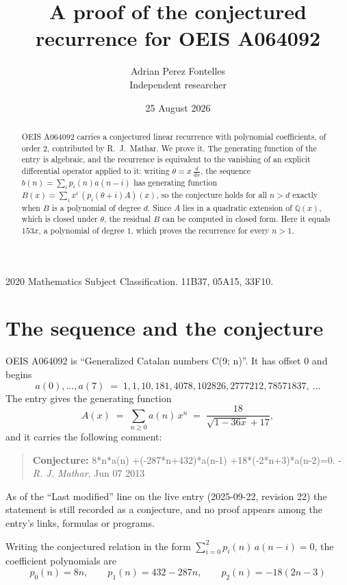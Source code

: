 \documentclass[11pt,a4paper]{article}
\title{A proof of the conjectured recurrence for OEIS A064092}
\author{Adrian Perez Fontelles\\ \small Independent researcher}
\date{25 August 2026}
\theoremstyle{plain}
\theoremstyle{definition}
\begin{document}
\maketitle

\begin{abstract}
OEIS A064092 carries a conjectured linear recurrence with polynomial coefficients, of
order 2, contributed by R.~J.~Mathar. We prove it. The generating function of the
entry is algebraic, and the recurrence is equivalent to the vanishing of an explicit
differential operator applied to it: writing $\theta=x\,\frac{d}{dx}$, the sequence
$b(n)=\sum_{i}p_{i}(n)a(n-i)$ has generating function
$B(x)=\sum_{i}x^{i}\,(p_{i}(\theta+i)A)(x)$, so the conjecture holds for all $n>d$ exactly
when $B$ is a polynomial of degree $d$. Since $A$ lies in a quadratic extension of
$\mathbb{Q}(x)$, which is closed under $\theta$, the residual $B$ can be computed in
closed form. Here it equals $153 x$, a polynomial of degree $1$, which proves
the recurrence for every $n>1$.
\end{abstract}

\noindent\small 2020 Mathematics Subject Classification. 11B37, 05A15, 33F10.\normalsize

\section{The sequence and the conjecture}

OEIS A064092 is ``Generalized Catalan numbers C(9; n)''. It has offset $0$ and begins
\[
a(0),\dots,a(7)\;=\;1, 1, 10, 181, 4078, 102826, 2777212, 78571837,\ \dots
\]
The entry gives the generating function
\begin{equation}\label{eq:gf}
A(x)\;=\;\sum_{n\ge 0} a(n)\,x^{n}\;=\;\frac{18}{\sqrt{1 - 36 x} + 17} ,
\end{equation}
and it carries the following comment:
\begin{quote}\small
\textbf{Conjecture:} 8*n*a(n) +(-287*n+432)*a(n-1) +18*(-2*n+3)*a(n-2)=0. - \emph{R. J. Mathar}, Jun 07 2013
\end{quote}
As of the ``Last modified'' line on the live entry (2025-09-22, revision 22) the
statement is still recorded as a conjecture, and no proof appears among the entry's links,
formulas or programs.

Writing the conjectured relation in the form $\sum_{i=0}^{2}p_{i}(n)\,a(n-i)=0$,
the coefficient polynomials are
\[
p_{0}(n)=8 n,\qquad p_{1}(n)=432 - 287 n,\qquad p_{2}(n)=- 18 \left(2 n - 3\right)
\]
\end{document}
